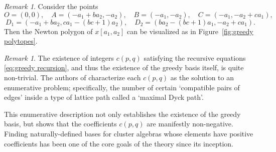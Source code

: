 \documentclass[11pt]{amsart}
\theoremstyle{remark}
\newtheorem{remark}[theorem]{Remark}
\numberwithin{equation}{section}
\begin{document}
\begin{remark}
  Consider the points 
  \[
    O=(0,0), \quad A=(-a_1+ba_2,-a_2), \quad B=(-a_1,-a_2), \quad C=(-a_1,-a_2+ca_1),
  \]
  \[
    D_1=(-a_1+ba_{2},ca_{1}-(bc+1)a_{2}), \quad D_2=(ba_{2}-(bc+1)a_{1},-a_2+ca_{1}).
  \]  
  Then the Newton polygon of $x[a_1,a_2]$ can be visualized as in Figure~\ref{fig:greedy polytopes}.
\end{remark}

\begin{remark}
The existence of integers $c(p,q)$ satisfying the recursive equations \eqref{eq:greedy recursion}, and thus the existence of the greedy basis itself, is quite non-trivial.  The authors of \cite{LLZ} characterize each $c(p,q)$ as the solution to an enumerative problem; specifically, the number of certain `compatible pairs of edges' inside a type of lattice path called a `maximal Dyck path'.

This enumerative description not only establishes the existence of the greedy basis, but shows that the coefficients $c(p,q)$ are manifestly non-negative.  Finding naturally-defined bases for cluster algebras whose elements have positive coefficients has been one of the core goals of the theory since its inception.  %
\end{remark}

\end{document}
